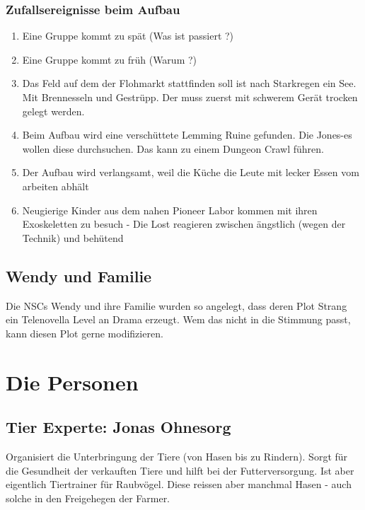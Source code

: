 \subsection{Zufallsereignisse beim Aufbau}

\begin{enumerate}
\item Eine Gruppe kommt zu spät (Was ist passiert ?)
\item Eine Gruppe kommt zu früh (Warum ?)
\item Das Feld auf dem der Flohmarkt stattfinden soll ist nach Starkregen ein See. Mit Brennesseln und Gestrüpp. Der muss zuerst mit schwerem Gerät trocken gelegt werden.
\item Beim Aufbau wird eine verschüttete Lemming Ruine gefunden. Die Jones-es wollen diese durchsuchen. Das kann zu einem Dungeon Crawl führen.
\item Der Aufbau wird verlangsamt, weil die Küche die Leute mit lecker Essen vom arbeiten abhält
\item Neugierige Kinder aus dem nahen Pioneer Labor kommen mit ihren Exoskeletten zu besuch - Die Lost reagieren zwischen ängstlich (wegen der Technik) und behütend
\end{enumerate}

\section{Wendy und Familie}

Die NSCs Wendy und ihre Familie wurden so angelegt, dass deren Plot Strang ein Telenovella Level an Drama erzeugt. Wem das nicht in die Stimmung passt, kann diesen Plot gerne modifizieren.

\chapter{Die Personen}

\section{Tier Experte: Jonas Ohnesorg}

Organisiert die Unterbringung der Tiere (von Hasen bis zu Rindern). Sorgt für die Gesundheit der verkauften Tiere und hilft bei der Futterversorgung. Ist aber eigentlich Tiertrainer für Raubvögel. Diese reissen aber manchmal Hasen - auch solche in den Freigehegen der Farmer.

